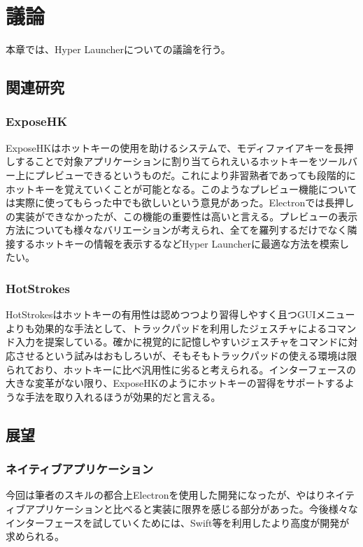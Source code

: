 \chapter{議論}
本章では、Hyper Launcherについての議論を行う。

\newpage

\section{関連研究}

\subsection{ExposeHK}
ExposeHK\cite{}はホットキーの使用を助けるシステムで、モディファイアキーを長押しすることで対象アプリケーションに割り当てられえいるホットキーをツールバー上にプレビューできるというものだ。これにより非習熟者であっても段階的にホットキーを覚えていくことが可能となる。このようなプレビュー機能については実際に使ってもらった中でも欲しいという意見があった。Electronでは長押しの実装ができなかったが、この機能の重要性は高いと言える。プレビューの表示方法についても様々なバリエーションが考えられ、全てを羅列するだけでなく隣接するホットキーの情報を表示するなどHyper Launcherに最適な方法を模索したい。

\subsection{HotStrokes}
HotStrokes\cite{}はホットキーの有用性は認めつつより習得しやすく且つGUIメニューよりも効果的な手法として、トラックパッドを利用したジェスチャによるコマンド入力を提案している。確かに視覚的に記憶しやすいジェスチャをコマンドに対応させるという試みはおもしろいが、そもそもトラックパッドの使える環境は限られており、ホットキーに比べ汎用性に劣ると考えられる。インターフェースの大きな変革がない限り、ExposeHKのようにホットキーの習得をサポートするような手法を取り入れるほうが効果的だと言える。

\section{展望}

\subsection{ネイティブアプリケーション}
今回は筆者のスキルの都合上Electronを使用した開発になったが、やはりネイティブアプリケーションと比べると実装に限界を感じる部分があった。今後様々なインターフェースを試していくためには、Swift等を利用したより高度が開発が求められる。

